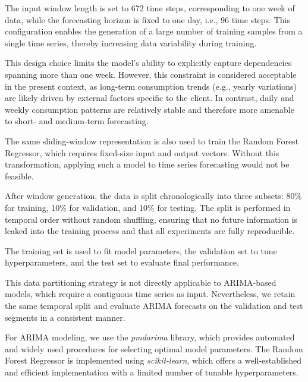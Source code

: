 \par
The input window length is set to 672 time steps, corresponding to one week of data, while the forecasting horizon is fixed to one day, i.e., 96 time steps. This configuration enables the generation of a large number of training samples from a single time series, thereby increasing data variability during training.

\par
This design choice limits the model’s ability to explicitly capture dependencies spanning more than one week. However, this constraint is considered acceptable in the present context, as long-term consumption trends (e.g., yearly variations) are likely driven by external factors specific to the client. In contrast, daily and weekly consumption patterns are relatively stable and therefore more amenable to short- and medium-term forecasting.

\par
The same sliding-window representation is also used to train the Random Forest Regressor, which requires fixed-size input and output vectors. Without this transformation, applying such a model to time series forecasting would not be feasible.

\par
After window generation, the data is split chronologically into three subsets: 80\% for training, 10\% for validation, and 10\% for testing. The split is performed in temporal order without random shuffling, ensuring that no future information is leaked into the training process and that all experiments are fully reproducible.

\par
The training set is used to fit model parameters, the validation set to tune hyperparameters, and the test set to evaluate final performance.

\par
This data partitioning strategy is not directly applicable to ARIMA-based models, which require a contiguous time series as input. Nevertheless, we retain the same temporal split and evaluate ARIMA forecasts on the validation and test segments in a consistent manner.

\par
For ARIMA modeling, we use the \textit{pmdarima} library, which provides automated and widely used procedures for selecting optimal model parameters. The Random Forest Regressor is implemented using \textit{scikit-learn}, which offers a well-established and efficient implementation with a limited number of tunable hyperparameters.

